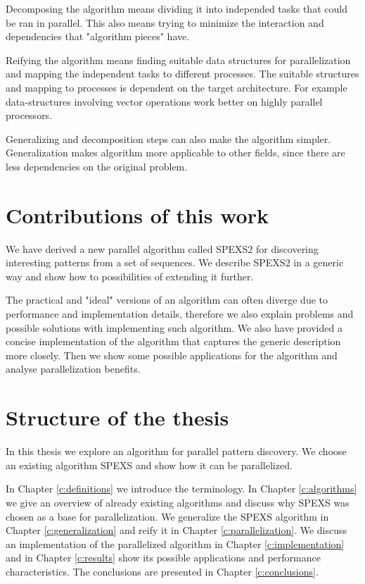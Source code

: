 Decomposing the algorithm means dividing it into independed tasks that could be ran in parallel. This also means trying to minimize the interaction and dependencies that "algorithm pieces" have.

Reifying the algorithm means finding suitable data structures for parallelization and mapping the independent tasks to different processes. The suitable structures and mapping to processes is dependent on the target architecture. For example data-structures involving vector operations work better on highly parallel processors.

Generalizing and decomposition steps can also make the algorithm simpler. Generalization makes algorithm more applicable to other fields, since there are less dependencies on the original problem.

\section{Contributions of this work}

We have derived a new parallel algorithm called SPEXS2 for discovering interesting patterns from a set of sequences. We describe SPEXS2 in a generic way and show how to possibilities of extending it further.

The practical and "ideal" versions of an algorithm can often diverge due to performance and implementation details, therefore we also explain problems and possible solutions with implementing such algorithm. We also have provided a concise implementation of the algorithm that captures the generic description more closely. Then we show some possible applications for the algorithm and analyse parallelization benefits.

\section{Structure of the thesis}

In this thesis we explore an algorithm for parallel pattern discovery. We choose an existing algorithm SPEXS\cite{spexs} and show how it can be parallelized.

In Chapter \ref{c:definitions} we introduce the terminology. In Chapter \ref{c:algorithms} we give an overview of already existing algorithms and discuss why SPEXS\cite{spexs} was chosen as a base for parallelization. We generalize the SPEXS algorithm in Chapter \ref{c:generalization} and reify it in Chapter \ref{c:parallelization}. We discuss an implementation of the parallelized algorithm in Chapter \ref{c:implementation} and in Chapter \ref{c:results} show its possible applications and performance characteristics. The conclusions are presented in Chapter \ref{c:conclusions}.
